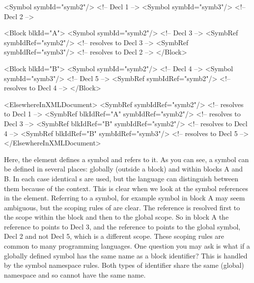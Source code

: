 \begin{xmlcode}
<Symbol symbId="symb2"/> <!-- Decl 1 -->
<Symbol symbId="symb3"/> <!-- Decl 2 -->

<Block blkId="A">
	<Symbol symbId="symb2"/> <!-- Decl 3 -->
        <SymbRef symbIdRef="symb2"/> <!-- resolves to Decl 3 -->
        <SymbRef symbIdRef="symb3"/>  <!-- resolves to Decl 2 -->
</Block>

<Block blkId="B">
	<Symbol symbId="symb2"/>  <!-- Decl 4 -->
	<Symbol symbId="symb3"/> <!-- Decl 5 -->
        <SymbRef symbIdRef="symb2"/>  <!-- resolves to Decl 4 -->
</Block>

<ElsewhereInXMLDocument>
	<SymbRef symbIdRef="symb2"/> <!-- resolves to Decl 1 -->
	<SymbRef blkIdRef="A" symbIdRef="symb2"/> <!-- resolves to Decl 3 -->
	<SymbRef blkIdRef="B" symbIdRef="symb2"/> <!-- resolves to Decl 4 -->
	<SymbRef blkIdRef="B" symbIdRef="symb3"/> <!-- resolves to Decl 5 -->
</ElsewhereInXMLDocument>
\end{xmlcode}
%
Here, the  element defines a symbol and 
refers to it.  As you can see, a symbol can be defined in several
places: globally (outside a block) and within blocks A and B. In each
case identical s are used, but the language can
distinguish between them because of the context. This is clear when we
look at the symbol references in the 
element. Referring to a symbol, for example symbol  in
block A may seem ambiguous, but the scoping rules of \pharmml are
clear. The reference is resolved first to the scope within the block
and then to the global scope. So in block A the reference to
 points to Decl 3, and the reference to 
points to the global symbol, Decl 2 and not Decl 5, which is a
different scope. These scoping rules are common to many programming
languages. One question you may ask is what if a globally defined symbol
has the same name as a block identifier? This is handled by the
symbol namespace rules. Both types of identifier share the same (global)
namespace and so cannot have the same name.

